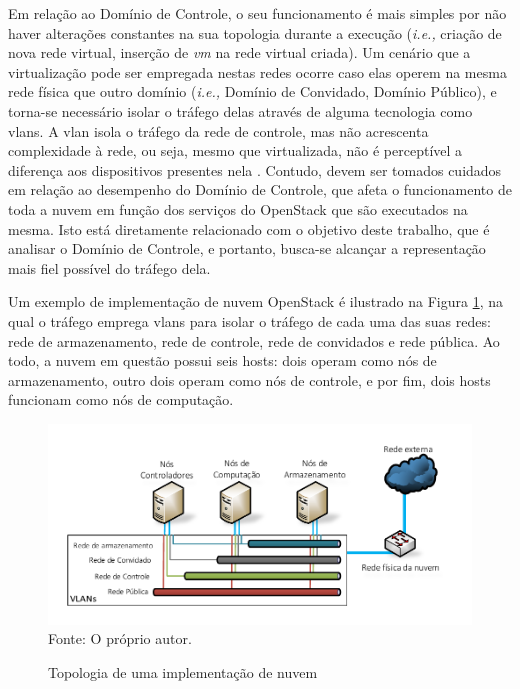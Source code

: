 Em relação ao Domínio de Controle, o seu funcionamento é mais simples por não haver alterações constantes na sua topologia durante a execução (\textit{i.e., } criação de nova rede virtual, inserção de \textit{vm} na rede virtual criada).
%
Um cenário que a virtualização pode ser empregada nestas redes ocorre caso elas operem na mesma rede física que outro domínio (\textit{i.e.,} Domínio de Convidado, Domínio Público), e torna-se necessário isolar o tráfego delas através de alguma tecnologia como \acp{vlan}.
%
A \ac{vlan} isola o tráfego da rede de controle, mas não acrescenta complexidade à rede, ou seja, mesmo que virtualizada, não é perceptível a diferença aos dispositivos presentes nela \cite{tanenbaum:2010}. 
%
Contudo, devem ser tomados cuidados em relação ao desempenho do Domínio de Controle, que afeta o funcionamento de toda a nuvem em função dos serviços do OpenStack que são executados na mesma.
%
Isto está diretamente relacionado com o objetivo deste trabalho, que é analisar o Domínio de Controle, e portanto, busca-se alcançar a representação mais fiel possível do tráfego dela.

Um exemplo de implementação de nuvem OpenStack é ilustrado na Figura \ref{fig:topologiaNuvemGenerica}, na qual o tráfego emprega \acp{vlan} para isolar o tráfego de cada uma das suas redes: rede de armazenamento, rede de controle, rede de convidados e rede pública.
%
Ao todo, a nuvem em questão possui seis hosts: dois operam como nós de armazenamento, outro dois operam como nós de controle, e por fim, dois hosts funcionam como nós de computação.
%
\begin{figure}[!htb]
	\centering
	\caption{Topologia de uma implementação de nuvem}
	\includegraphics[width=1\textwidth]{img/topologia_generica.pdf}
	\label{fig:topologiaNuvemGenerica}\\
	Fonte: O próprio autor.
\end{figure}

